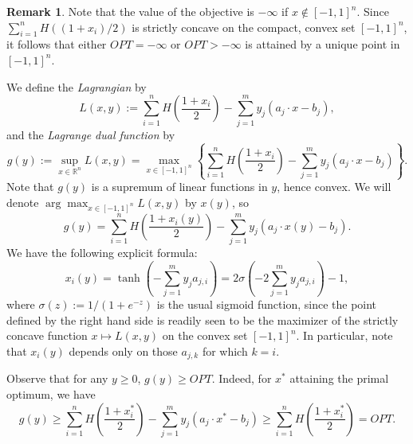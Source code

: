 \documentclass[final, 12pt]{colt2018}
\newcommand{\R}{\mathbb{R}}
\theoremstyle{definition}
\newtheorem{remark}[theorem]{Remark}
\theoremstyle{plain}
\begin{document}
\begin{remark}
Note that the value of the objective is $-\infty$ if $x\notin [-1,1]^{n}$. Since $\sum_{i=1}^{n} H((1+x_i)/2)$ is strictly concave on the compact, convex set $[-1,1]^{n}$, it follows that either $OPT = -\infty$ or $OPT > -\infty$ is attained by a unique point in $[-1,1]^{n}$.    
\end{remark}
We define the \emph{Lagrangian} by
\[ L(x,y) := \sum_{i = 1}^n H\left(\frac{1+x_i}{2}\right) - \sum_{j = 1}^m y_j (a_j \cdot x - b_j), \]
and the \emph{Lagrange dual function} by
\[ g(y) := \sup_{x\in \R^{n}} L(x,y) = \max_{x\in [-1,1]^{n}}\left\{\sum_{i = 1}^n H\left(\frac{1+x_i}{2}\right) - \sum_{j = 1}^m y_j (a_j \cdot x - b_j)\right\}. \]
Note that $g(y)$ is a supremum of linear functions in $y$, hence convex.
We will denote $\arg\max_{x\in [-1,1]^n}L(x,y)$ by $x(y)$, so
\[ g(y) = \sum_{i = 1}^n H\left(\frac{1+x_i(y)}{2}\right) - \sum_{j = 1}^m y_j (a_j \cdot x(y) - b_j). \]
We have the following explicit formula:
\begin{equation}
\label{eqn:explicit-form-x(y)}
x_i(y) = \tanh\left(-\sum_{j=1}^{m}y_{j}a_{j,i}\right) = 2\sigma\left(-2\sum_{j=1}^{m}y_{j}a_{j,i}\right)-1,
\end{equation}
where $\sigma(z):=1/(1+e^{-z})$ is the usual sigmoid function, since the point defined by the right hand side is readily seen to be the maximizer of the strictly concave function $x\mapsto L(x,y)$ on the convex set $[-1,1]^{n}$. In particular, note that $x_i(y)$ depends only on those $a_{j,k}$ for which $k=i$. 

Observe that for any $y \ge 0$, $g(y) \ge OPT$. Indeed, for $x^*$ attaining the primal optimum, we have  
\begin{equation}\label{weak-duality}
g(y) \ge \sum_{i = 1}^n H\left(\frac{1+x_i^*}{2}\right) - \sum_{j = 1}^m y_j (a_j \cdot x^* - b_j) \ge \sum_{i = 1}^n H\left(\frac{1+x_i^*}{2}\right) = OPT.
\end{equation}
\end{document}
